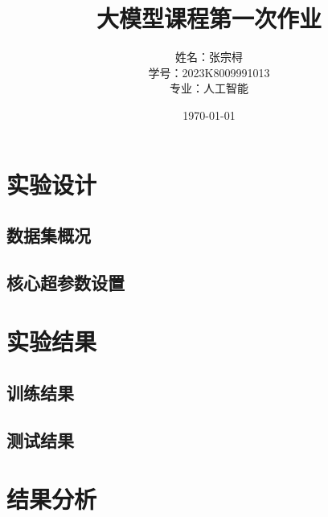 \documentclass[a4paper,12pt]{ctexart} %
\title{\textbf{大模型课程第一次作业}}
\author{姓名：张宗桪 \\ 学号：2023K8009991013 \\ 专业：人工智能}
\date{\today}
\begin{document}
\pagestyle{plain} %

\maketitle
\thispagestyle{empty} %
\newpage

\tableofcontents
\newpage
\section{实验设计}


\subsection{数据集概况}


\subsection{核心超参数设置}


\section{实验结果}


\subsection{训练结果}


\subsection{测试结果}


\section{结果分析}
\end{document}
